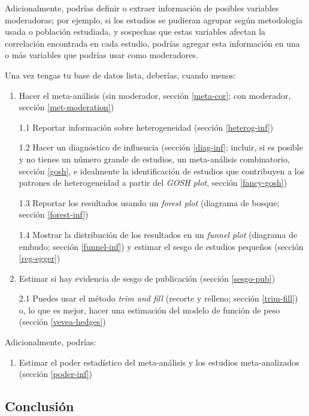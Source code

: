 \documentclass[
  bookmarksnumbered]{article}
\providecommand{\tightlist}{%
  \setlength{\itemsep}{0pt}\setlength{\parskip}{0pt}}
\begin{document}
Adicionalmente, podrías definir o extraer información de posibles variables moderadoras; por ejemplo, si los estudios se pudieran agrupar según metodología usada o población estudiada, y sospechas que estas variables afectan la correlación encontrada en cada estudio, podrías agregar esta información en una o más variables que podrías usar como moderadores.

Una vez tengas tu base de datos lista, deberías, cuando menos:

\begin{enumerate}
\def\labelenumi{\arabic{enumi}.}
\item
  Hacer el meta-análisis (sin moderador, sección \ref{meta-cor}; con moderador, sección \ref{met-moderation})

  1.1 Reportar información sobre heterogeneidad (sección \ref{heterog-inf})

  1.2 Hacer un diagnóstico de influencia (sección \ref{diag-inf}; incluir, si es posible y no tienes un número grande de estudios, un meta-análisis combinatorio, sección \ref{gosh}, e idealmente la identificación de estudios que contribuyen a los patrones de heterogeneidad a partir del \emph{GOSH plot}, sección \ref{fancy-gosh})

  1.3 Reportar los resultados usando un \emph{forest plot} (diagrama de bosque; sección \ref{forest-inf})

  1.4 Mostrar la distribución de los resultados en un \emph{funnel plot} (diagrama de embudo; sección \ref{funnel-inf}) y estimar el sesgo de estudios pequeños (sección \ref{reg-egger})
\item
  Estimar si hay evidencia de sesgo de publicación (sección \ref{sesgo-pub})

  2.1 Puedes usar el método \emph{trim and fill} (recorte y relleno; sección \ref{trim-fill}) o, lo que es mejor, hacer una estimación del modelo de función de peso (sección \ref{vevea-hedges})
\end{enumerate}

Adicionalmente, podrías:

\begin{enumerate}
\def\labelenumi{\arabic{enumi}.}
\setcounter{enumi}{2}
\tightlist
\item
  Estimar el poder estadístico del meta-análisis y los estudios meta-analizados (sección \ref{poder-inf})
\end{enumerate}

\hypertarget{conclusiuxf3n}{%
\subsection{Conclusión}\label{conclusiuxf3n}}
\end{document}
